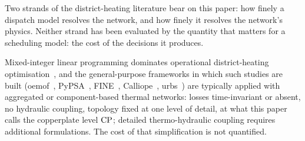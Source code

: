 
Two strands of the district-heating literature bear on this paper: how finely a
dispatch model resolves the network, and how finely it resolves the network's physics.
Neither strand has been evaluated by the quantity that matters for a scheduling model:
the cost of the decisions it produces.

Mixed-integer linear programming dominates operational district-heating
optimisation~\cite{Fang2016}, and the general-purpose frameworks in which such studies are
built (oemof~\cite{Hilpert2018_oemof}, PyPSA~\cite{Brown2018_pypsa},
FINE~\cite{Welder2018_FINE}, Calliope~\cite{Pfenninger2018_calliope},
urbs~\cite{Dorfner2016_urbs}) are typically applied with aggregated or component-based
thermal networks: losses time-invariant or absent, no hydraulic coupling, topology fixed at
one level of detail, at what this paper calls the copperplate level $\mathrm{CP}$; detailed
thermo-hydraulic coupling requires additional formulations. The cost of that simplification
is not quantified.

